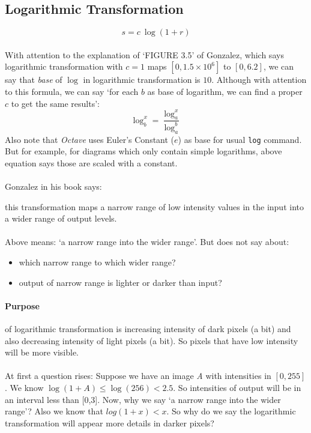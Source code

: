 \subsection{Logarithmic Transformation}

\[s=c\ \log(1+r)\]
\paragraph{}\label{note:note_about_log_base}
With attention to the explanation of `FIGURE 3.5' of Gonzalez, which
says logarithmic transformation with $c=1$ maps $[0,1.5 \times 10^6]$ to
$[0,6.2]$, we can say that \emph{base} of $\log$ in logarithmic transformation
is $10$. Although with attention to this formula, we can say `for each $b$ as
base of logarithm, we can find a proper $c$ to get the same results':
\[\log_b^x=\frac{\log_a^x}{\log_a^b}\]
Also note that \emph{Octave} uses Euler's Constant ($e$) as base for usual
\texttt{log} command. But for example, for diagrams which only contain simple
logarithms,  above equation says those are scaled with a constant.
\paragraph{}Gonzalez in his book says:
\begin{displayquote}
    this transformation maps a narrow range of low intensity values in the
    input into a wider range of output levels. 
\end{displayquote}
\paragraph{}Above means: `a narrow range into the wider range'. But does not say about:
\begin{itemize}
    \item which narrow range to which wider range?
    \item output of narrow range is lighter or darker than input?
\end{itemize}
\paragraph{Purpose}\label{purpose_of_logarithmic_transformation} of 
logarithmic transformation is increasing intensity of
dark pixels (a bit) and also decreasing intensity of light pixels (a bit). So
pixels that have low intensity will be more visible. 

\paragraph{}At first a question rises: Suppose we have an image \emph{A} with
intensities in $[0,255]$. We know $\log(1+A) \leq  \log(256) < 2.5$. So
intensities of output will be in an interval less than [0,3]. Now, why we say `a
narrow range into the wider range'? Also we know that $log(1+x) < x$. So why do
we say the logarithmic transformation will appear more details in darker pixels?

